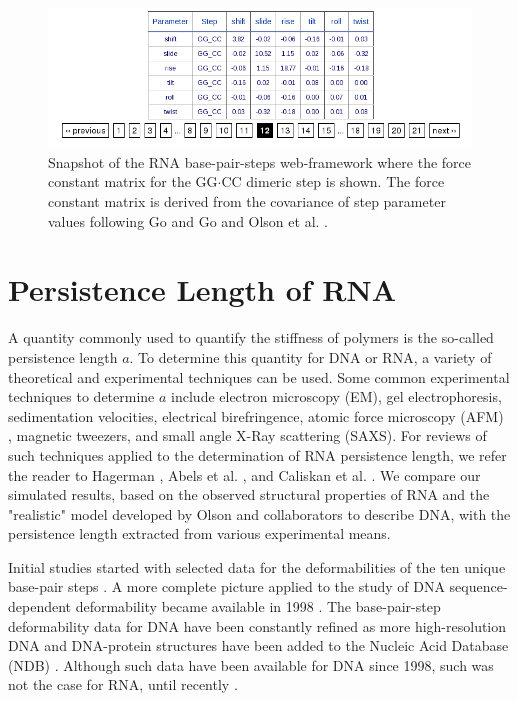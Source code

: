 \begin{figure}[htbp]
\centering
\includegraphics[angle=0, scale=0.6]{Chapter4/forceconst.png}
\caption{Snapshot of  the RNA base-pair-steps  web-framework where the
  force constant matrix for the GG$\cdot$CC dimeric step is shown. The
  force  constant  matrix  is  derived  from the  covariance  of  step
  parameter  values following  Go and  Go \cite{go1976}  and  Olson et
  al. \cite{olson1998}.}
\label{fig:forceconst}
\end{figure}  

\section{Persistence Length of RNA}
A quantity commonly used to  quantify the stiffness of polymers is the
so-called persistence  length $a$. To determine this  quantity for DNA
or RNA,  a variety of  theoretical and experimental techniques  can be
used.  Some  common experimental  techniques to determine  $a$ include
electron   microscopy   (EM),   gel   electrophoresis,   sedimentation
velocities, electrical birefringence,  atomic force microscopy (AFM) ,
magnetic  tweezers,  and small  angle  X-Ray  scattering (SAXS).   For
reviews  of  such  techniques  applied  to the  determination  of  RNA
persistence    length,    we   refer    the    reader   to    Hagerman
\cite{hagerman1997}, Abels  et al.  \cite{abels2005},  and Caliskan et
al.  \cite{caliskan2005}.  We compare  our simulated results, based on
the observed  structural properties of  RNA and the  "realistic" model
developed by Olson and collaborators \cite{marky1994a, maroun1988a} to
describe  DNA,  with the  persistence  length  extracted from  various
experimental means.

Initial studies started with  selected data for the deformabilities of
the  ten unique  base-pair  steps \cite{olson1995}.   A more  complete
picture applied  to the study of  DNA sequence-dependent deformability
became  available   in  1998  \cite{olson1998}.    The  base-pair-step
deformability  data  for  DNA  have  been constantly  refined  as  more
high-resolution DNA and DNA-protein  structures have been added to the
Nucleic Acid Database (NDB) \cite{balasubramanian2009}.  Although such
data have been available for DNA  since 1998, such was not the case for
RNA, until recently \cite{olson2009}.

